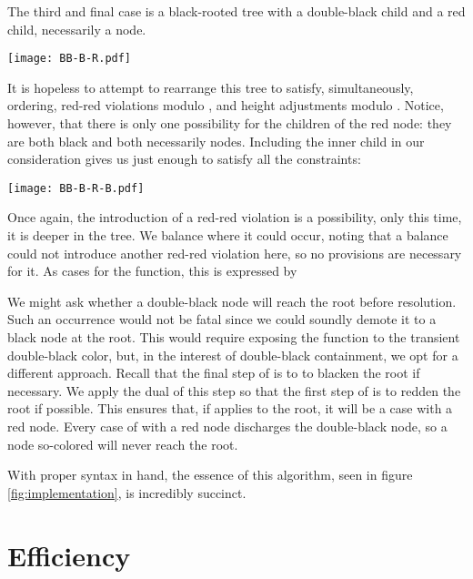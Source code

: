 \documentclass[preprint]{sigplanconf}
\begin{document}
The third and final case is a black-rooted tree with a double-black child and a
red child, necessarily a node.
\begin{center}
\texttt{[image: BB-B-R.pdf]}
\end{center}
It is hopeless to attempt to rearrange this tree to satisfy, simultaneously,
ordering, red-red violations modulo , and height adjustments
modulo . Notice, however, that there is only one possibility for
the children of the red node: they are both black and both necessarily nodes.
Including the inner child in our consideration gives us just enough to satisfy
all the constraints:
\begin{center}
\texttt{[image: BB-B-R-B.pdf]}
\end{center}
Once again, the introduction of a red-red violation is a possibility, only this
time, it is deeper in the tree. We balance where it could occur, noting that a
balance could not introduce another red-red violation here, so no provisions are
necessary for it. As cases for the  function, this is expressed
by
\begin{schemedisplay}
[(B (BB? a-w-b) x (R (B c y d) z e))
 (B (balance (B (R (-B a-w-b) x c) y d)) z e)]
[(B (R a w (B b x c)) y (BB? d-z-e))
 (B a w (balance (B b x (R c y (-B d-z-e)))))]
\end{schemedisplay}

We might ask whether a double-black node will reach the root before resolution.
Such an occurrence would not be fatal since we could soundly demote it to a
black node at the root. This would require exposing the 
function to the transient double-black color, but, in the interest of
double-black containment, we opt for a different approach. Recall that the final
step of  is to to blacken the root if necessary. We apply the
dual of this step so that the first step of  is to redden the
root if possible. This ensures that, if  applies to the root, it
will be a case with a red node. Every case of  with a red node
discharges the double-black node, so a node so-colored will never reach the
root.

With proper syntax in hand, the essence of this algorithm, seen in figure
\ref{fig:implementation}, is incredibly succinct.

\section{Efficiency}
\end{document}
